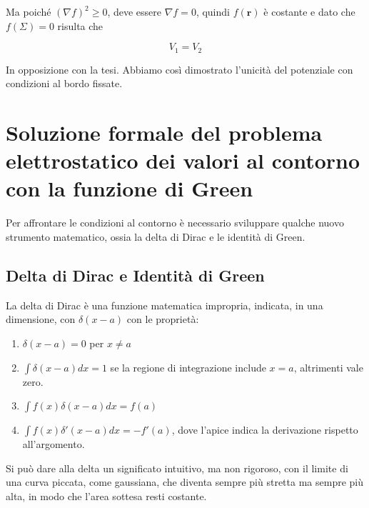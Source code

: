 Ma poiché $(\nabla f)^2 \ge 0$, deve essere $\nabla f = 0$, quindi $f(\mathbf{r})$ è costante e dato che $f(\Sigma) = 0$ risulta che 

\begin{equation}
    V_1 = V_2
\end{equation}

In opposizione con la tesi. Abbiamo così dimostrato l'unicità del potenziale con condizioni al bordo fissate. 

\newpage

\section{Soluzione formale del problema elettrostatico dei valori al contorno con la funzione di Green}

Per affrontare le condizioni al contorno è necessario sviluppare qualche nuovo strumento matematico, ossia la delta di Dirac e le identità di Green.


\subsection{Delta di Dirac e Identità di Green}

La delta di Dirac  è una funzione matematica impropria, indicata, in una dimensione, con $\delta (x -a)$ con le proprietà: \\

\begin{enumerate}
    \item $\delta (x - a) = 0$ per $x \neq a$ \\
    \item $\int \delta(x -a) dx = 1$ se la regione di integrazione include $x = a$, altrimenti vale zero. \\
    \item $\int f(x) \delta (x -a) dx = f(a)$ \\
    \item $\int f(x) \delta ' (x - a) dx = - f' (a)$, dove l'apice indica la derivazione rispetto all'argomento. \\
\end{enumerate}

Si può dare alla delta un significato intuitivo, ma non rigoroso, con il limite di una curva piccata, come gaussiana, che diventa sempre più stretta ma sempre più alta, in modo che l'area sottesa resti costante. \\

